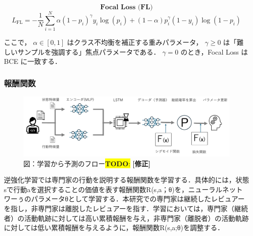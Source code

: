\documentclass[submit,techrep,noauthor]{ipsj}
\newcommand{\todo}[1]{\colorbox{yellow}{{\bf TODO}:}{\color{red} {\textbf{[#1]}}}}
\begin{document}
\[\textbf{Focal Loss (FL)}\]
\[
L_{\mathrm{FL}} = - \frac{1}{N} \sum_{i=1}^{N} \alpha (1 - p_i)^{\gamma} y_i \log(p_i) + (1 - \alpha) p_i^{\gamma} (1 - y_i) \log(1 - p_i)
\]

ここで，
\(\alpha \in [0,1]\) はクラス不均衡を補正する重みパラメータ，  
\(\gamma \ge 0\) は「難しいサンプルを強調する」焦点パラメータである．  
\(\gamma = 0\) のとき，Focal Loss は BCE に一致する．


\subsubsection{報酬関数}
\begin{figure}[t]
    \centering
    \includegraphics[width = 1.0\textwidth]{./Hashimoto_fig/prediction.pdf}
    \caption{図：学習から予測のフロー\todo{修正}}
    \label{fig:RL}
\end{figure}

逆強化学習では専門家の行動を説明する報酬関数を学習する．具体的には，状態sで行動aを選択することの価値を表す報酬関数R(s,a；θ)を，ニューラルネットワーぅのパラメータθとして学習する．本研究での専門家は継続したレビュアーを指し，非専門家は離脱したレビュアーを指す．学習においては，専門家（継続者）の活動軌跡に対しては高い累積報酬を与え，非専門家（離脱者）の活動軌跡に対しては低い累積報酬を与えるように，報酬関数R(s,a;θ)を調整する．
\end{document}
